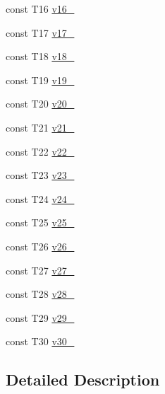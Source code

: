 \begin{DoxyCompactItemize}
\item 
const \-T16 \hyperlink{classtesting_1_1internal_1_1ValueArray30_a8b2b80d31925c1583c3e694d2bf235c5}{v16\-\_\-}
\item 
const \-T17 \hyperlink{classtesting_1_1internal_1_1ValueArray30_a9f59ea9e6f3642f77227dd1f7882d649}{v17\-\_\-}
\item 
const \-T18 \hyperlink{classtesting_1_1internal_1_1ValueArray30_ad07972ee98135c8deb090fc891a04e3e}{v18\-\_\-}
\item 
const \-T19 \hyperlink{classtesting_1_1internal_1_1ValueArray30_a3ad77b5b43c14332dabc9d47c8907e7f}{v19\-\_\-}
\item 
const \-T20 \hyperlink{classtesting_1_1internal_1_1ValueArray30_adb43992f7b5f5f07e0187003b8c9c872}{v20\-\_\-}
\item 
const \-T21 \hyperlink{classtesting_1_1internal_1_1ValueArray30_a80089b2eaa99efb5d3559378fbdac426}{v21\-\_\-}
\item 
const \-T22 \hyperlink{classtesting_1_1internal_1_1ValueArray30_aeec4c711a4f7cf166e6a2646aa7d0bc7}{v22\-\_\-}
\item 
const \-T23 \hyperlink{classtesting_1_1internal_1_1ValueArray30_a7f672a4a694f749a8b6119bff7705a66}{v23\-\_\-}
\item 
const \-T24 \hyperlink{classtesting_1_1internal_1_1ValueArray30_a6c10a180ac97815f7d3f4522507e91ca}{v24\-\_\-}
\item 
const \-T25 \hyperlink{classtesting_1_1internal_1_1ValueArray30_a26cfe8143447970e30441924be04bf08}{v25\-\_\-}
\item 
const \-T26 \hyperlink{classtesting_1_1internal_1_1ValueArray30_a26c3ac1aaf85c25e014a5001cfecb4c5}{v26\-\_\-}
\item 
const \-T27 \hyperlink{classtesting_1_1internal_1_1ValueArray30_aee0cd82b89da8c22b3d49e9beea5f0a4}{v27\-\_\-}
\item 
const \-T28 \hyperlink{classtesting_1_1internal_1_1ValueArray30_a70009fbc6bb95bda68add912f5116104}{v28\-\_\-}
\item 
const \-T29 \hyperlink{classtesting_1_1internal_1_1ValueArray30_af5743c2e9de580ce4416c299770416a1}{v29\-\_\-}
\item 
const \-T30 \hyperlink{classtesting_1_1internal_1_1ValueArray30_a0a75e109ea8f799aed9803fd1eaa4af2}{v30\-\_\-}
\end{DoxyCompactItemize}


\subsection{\-Detailed \-Description}
